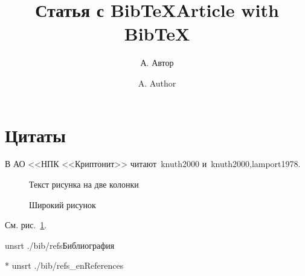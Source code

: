 \documentclass[12pt]{article}
\begin{document}
\title{Статья с BibTeX}
\author{А. Автор}
\maketitle

\section{Цитаты}
В АО <<НПК <<Криптонит>> читают~\cite{rus}{knuth2000} и~\cite{rus}{knuth2000,lamport1978}.

\begin{figure}[h]
\centering
Текст рисунка на две колонки
\caption{Широкий рисунок}\label{fig:wide}
\end{figure}
См. рис.~\ref{fig:wide}.

{unsrt}
{./bib/refs}{Библиография}

\title{Article with BibTeX}
\author{A. Author}
\nocite{eng}{*}
{unsrt}
{./bib/refs_en}{References}
\end{document}
